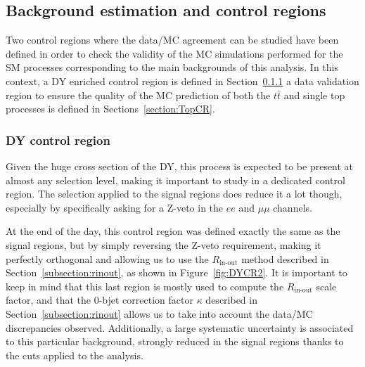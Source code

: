 \documentclass[a4paper, 10pt, openright]{report}
\begin{document}
\subsection{Background estimation and control regions} \label{section:CR}

Two control regions where the data/\ac{MC} agreement can be studied have been defined in order to check the validity of the \ac{MC} simulations performed for the \ac{SM} processes corresponding to the main backgrounds of this analysis. In this context, a \ac{DY} enriched control region is defined in Section~\ref{section:DYCR} a data validation region to ensure the quality of the \ac{MC} prediction of both the $t \bar t$ and single top processes is defined in Sections~\ref{section:TopCR}.%

\subsubsection{\acs{DY} control region} \label{section:DYCR}

Given the huge cross section of the \ac{DY}, this process is expected to be present at almost any selection level, making it important to study in a dedicated control region. The selection applied to the signal regions does reduce it a lot though, especially by specifically asking for a Z-veto in the $ee$ and $\mu \mu$ channels. 

At the end of the day, this control region was defined exactly the same as the signal regions, but by simply reversing the Z-veto requirement, making it perfectly orthogonal and allowing us to use the $R_{\text{in-out}}$ method described in Section~\ref{subsection:rinout}, as shown in Figure~\ref{fig:DYCR2}. It is important to keep in mind that this last region is mostly used to compute the $R_{\text{in-out}}$ scale factor, and that the 0-bjet correction factor $\kappa$ described in Section~\ref{subsection:rinout} allows us to take into account the data/MC discrepancies observed. Additionally, a large systematic uncertainty is associated to this particular background, strongly reduced in the signal regions thanks to the cuts applied to the analysis.
\end{document}
